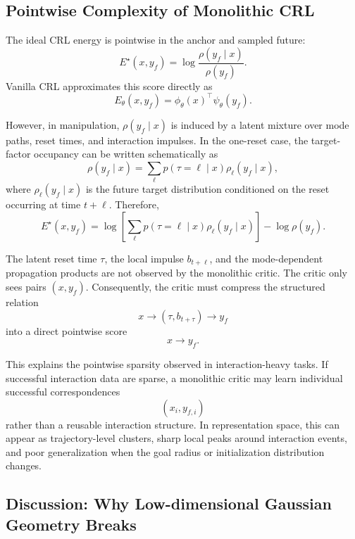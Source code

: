 \subsection{Pointwise Complexity of Monolithic CRL}

The ideal CRL energy is pointwise in the anchor and sampled future:
\begin{equation}
E^\star(x,y_f)
=
\log
\frac{\rho(y_f\mid x)}
{\rho(y_f)}.
\end{equation}
Vanilla CRL approximates this score directly as
\begin{equation}
E_\theta(x,y_f)
=
\phi_\theta(x)^\top\psi_\theta(y_f).
\end{equation}

However, in manipulation, \(\rho(y_f\mid x)\) is induced by a latent mixture over mode paths, reset times, and interaction impulses. In the one-reset case, the target-factor occupancy can be written schematically as
\begin{equation}
\rho(y_f\mid x)
=
\sum_{\ell}
p(\tau=\ell\mid x)
\rho_\ell(y_f\mid x),
\end{equation}
where \(\rho_\ell(y_f\mid x)\) is the future target distribution conditioned on the reset occurring at time \(t+\ell\). Therefore,
\begin{equation}
E^\star(x,y_f)
=
\log
\left[
\sum_{\ell}
p(\tau=\ell\mid x)
\rho_\ell(y_f\mid x)
\right]
-
\log \rho(y_f).
\end{equation}

The latent reset time \(\tau\), the local impulse \(b_{t+\ell}\), and the mode-dependent propagation products are not observed by the monolithic critic. The critic only sees pairs \((x,y_f)\). Consequently, the critic must compress the structured relation
\[
x
\rightarrow
(\tau,b_{t+\tau})
\rightarrow
y_f
\]
into a direct pointwise score
\[
x
\rightarrow
y_f.
\]

This explains the pointwise sparsity observed in interaction-heavy tasks. If successful interaction data are sparse, a monolithic critic may learn individual successful correspondences
\[
(x_i,y_{f,i})
\]
rather than a reusable interaction structure. In representation space, this can appear as trajectory-level clusters, sharp local peaks around interaction events, and poor generalization when the goal radius or initialization distribution changes.

\subsection{Discussion: Why Low-dimensional Gaussian Geometry Breaks}

